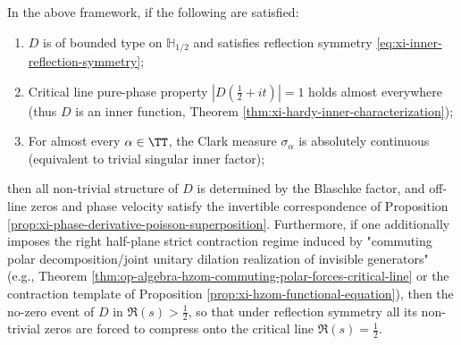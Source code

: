 \begin{theorem}\label{thm:xi-rh-sufficient-template-inner-clark-conservative}
In the above framework, if the following are satisfied:
\begin{enumerate}
  \item \(D\) is of bounded type on \(\mathbb{H}_{1/2}\) and satisfies reflection symmetry \eqref{eq:xi-inner-reflection-symmetry};
  \item Critical line pure-phase property \(|D(\tfrac12+it)|=1\) holds almost everywhere (thus \(D\) is an inner function, Theorem \ref{thm:xi-hardy-inner-characterization});
  \item For almost every \(\alpha\in\TT\), the Clark measure \(\sigma_\alpha\) is absolutely continuous (equivalent to trivial singular inner factor);
\end{enumerate}
then all non-trivial structure of \(D\) is determined by the Blaschke factor, and off-line zeros and phase velocity satisfy the invertible correspondence of Proposition \ref{prop:xi-phase-derivative-poisson-superposition}.
Furthermore, if one additionally imposes the right half-plane strict contraction regime induced by "commuting polar decomposition/joint unitary dilation realization of invisible generators" (e.g., Theorem \ref{thm:op-algebra-hzom-commuting-polar-forces-critical-line} or the contraction template of Proposition \ref{prop:xi-hzom-functional-equation}), then the no-zero event of \(D\) in \(\Re(s)>\tfrac12\), so that under reflection symmetry all its non-trivial zeros are forced to compress onto the critical line \(\Re(s)=\tfrac12\).
\end{theorem}

\endinput
